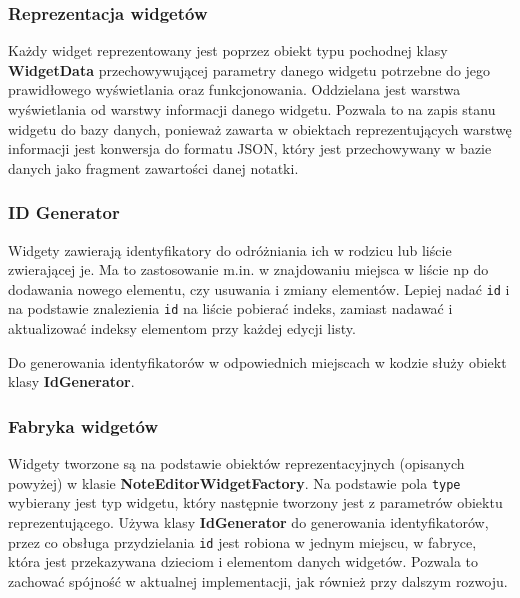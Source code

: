 \subsubsection{Reprezentacja widgetów}

Każdy widget reprezentowany jest poprzez obiekt typu pochodnej klasy \textbf{WidgetData} przechowywującej parametry danego widgetu potrzebne do jego prawidłowego wyświetlania oraz funkcjonowania. Oddzielana jest warstwa wyświetlania od warstwy informacji danego widgetu. Pozwala to na zapis stanu widgetu do bazy danych, ponieważ zawarta w obiektach reprezentujących warstwę informacji jest konwersja do formatu JSON, który jest przechowywany w bazie danych jako fragment zawartości danej notatki.

\subsubsection{ID Generator}

Widgety zawierają identyfikatory do odróżniania ich w rodzicu lub liście zwierającej je. Ma to zastosowanie m.in. w znajdowaniu miejsca w liście np do dodawania nowego elementu, czy usuwania i zmiany elementów. Lepiej nadać \texttt{id} i na podstawie znalezienia \texttt{id} na liście pobierać indeks, zamiast nadawać i aktualizować indeksy elementom przy każdej edycji listy.

Do generowania identyfikatorów w odpowiednich miejscach w kodzie służy obiekt klasy \textbf{IdGenerator}.

\subsubsection{Fabryka widgetów}

Widgety tworzone są na podstawie obiektów reprezentacyjnych (opisanych powyżej) w klasie \textbf{NoteEditorWidgetFactory}. Na podstawie pola \texttt{type} wybierany jest typ widgetu, który następnie tworzony jest z parametrów obiektu reprezentującego. Używa klasy \textbf{IdGenerator} do generowania identyfikatorów, przez co obsługa przydzielania \texttt{id} jest robiona w jednym miejscu, w fabryce, która jest przekazywana dzieciom i elementom danych widgetów. Pozwala to zachować spójność w aktualnej implementacji, jak również przy dalszym rozwoju.